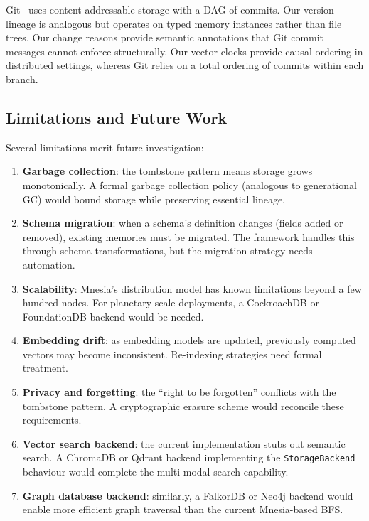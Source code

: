 \documentclass[12pt,a4paper]{article}
\theoremstyle{definition}
\begin{document}
Git~\citep{chacon2014pro} uses content-addressable storage with a DAG of commits.
Our version lineage is analogous but operates on typed memory instances rather than file trees.
Our change reasons provide semantic annotations that Git commit messages cannot enforce structurally.
Our vector clocks provide causal ordering in distributed settings, whereas Git relies on a total ordering of commits within each branch.

\subsection{Limitations and Future Work}\label{subsec:limitations}

Several limitations merit future investigation:

\begin{enumerate}
  \item \textbf{Garbage collection}: the tombstone pattern means storage grows monotonically.
  A formal garbage collection policy (analogous to generational GC) would bound storage while preserving essential lineage.
  \item \textbf{Schema migration}: when a schema's definition changes (fields added or removed), existing memories must be migrated.
  The framework handles this through schema transformations, but the migration strategy needs automation.
  \item \textbf{Scalability}: Mnesia's distribution model has known limitations beyond a few hundred nodes.
  For planetary-scale deployments, a CockroachDB or FoundationDB backend would be needed.
  \item \textbf{Embedding drift}: as embedding models are updated, previously computed vectors may become inconsistent.
  Re-indexing strategies need formal treatment.
  \item \textbf{Privacy and forgetting}: the ``right to be forgotten'' conflicts with the tombstone pattern.
  A cryptographic erasure scheme would reconcile these requirements.
  \item \textbf{Vector search backend}: the current implementation stubs out semantic search.
  A ChromaDB or Qdrant backend implementing the \texttt{StorageBackend} behaviour would complete the multi-modal search capability.
  \item \textbf{Graph database backend}: similarly, a FalkorDB or Neo4j backend would enable more efficient graph traversal than the current Mnesia-based BFS.
\end{enumerate}
\end{document}
